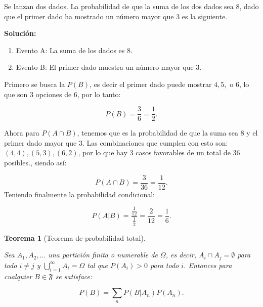 \documentclass[
  us-letterpaper,
]{scrreprt}
\theoremstyle{plain}
\theoremstyle{plain}
\newtheorem{theorem}{Teorema}[chapter]
\theoremstyle{definition}
\theoremstyle{remark}
\begin{document}
\begin{tcolorbox}[enhanced jigsaw, titlerule=0mm, opacityback=0, coltitle=black, bottomrule=.15mm, colbacktitle=quarto-callout-caution-color!10!white, toprule=.15mm, colback=white, arc=.35mm, colframe=quarto-callout-caution-color-frame, leftrule=.75mm, bottomtitle=1mm, left=2mm, toptitle=1mm, opacitybacktitle=0.6, breakable, title={Ejemplo (\textbf{\emph{Probabilidad Condicional}})}, rightrule=.15mm]

Se lanzan dos dados. La probabilidad de que la suma de los dos dados sea
\(8\), dado que el primer dado ha mostrado un número mayor que \(3\) es
la siguiente.

\textbf{Solución:}

\begin{enumerate}
\def\labelenumi{\arabic{enumi}.}
\item
  Evento A: La suma de los dados es \(8\).
\item
  Evento B: El primer dado muestra un número mayor que \(3\).
\end{enumerate}

Primero se busca la \(P(B)\), es decir el primer dado puede mostrar
\(4, 5,\) o \(6\), lo que son 3 opciones de \(6\), por lo tanto:

\[
P(B) = \frac{3}{6} = \frac{1}{2}.
\]

Ahora para \(P(A \cap B)\), tenemos que es la probabilidad de que la
suma sea \(8\) y el primer dado mayor que \(3\). Las combinaciones que
cumplen con esto son: \((4,4), (5,3),(6,2)\), por lo que hay 3 casos
favorables de un total de 36 posibles., siendo así:

\[
P(A\cap B) = \frac{3}{36} = \frac{1}{12}.
\] Teniendo finalmente la probabilidad condicional:

\[
P(A|B) = \frac{\frac{1}{12}}{\frac{1}{2}} = \frac{2}{12} =\frac{1}{6}.
\]

\end{tcolorbox}

\begin{theorem}[Teorema de probabilidad
total]\protect\hypertarget{thm-prob_total}{}\label{thm-prob_total}

Sea \(A_1, A_2, ...\) una partición finita o numerable de \(\Omega\), es
decir, \(A_i \cap A_j = \emptyset\) \emph{para todo} \(i\neq j\)
\emph{y} \(\bigcup_{i=1}^{\infty} A_i = \Omega\) tal que \(P(A_i)>0\)
\emph{para todo} \(i\)\emph{. Entonces para cualquier}
\(B \in \mathfrak{F}\) \emph{se satisface:}

\[
P(B) = \sum_n P(B|A_n)P(A_n).
\]

\end{theorem}
\end{document}
